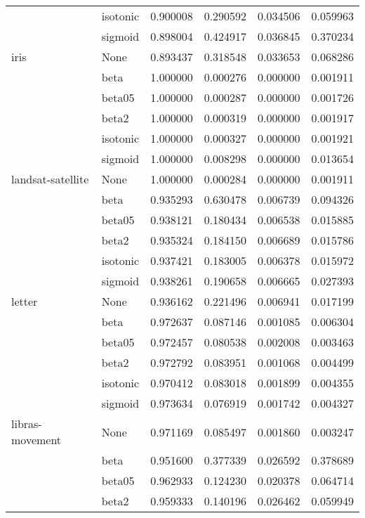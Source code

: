 \begin{tabular}{llrrrr}
        & isotonic &  0.900008 &   0.290592 &  0.034506 &  0.059963 \\
        & sigmoid &  0.898004 &   0.424917 &  0.036845 &  0.370234 \\
iris & None &  0.893437 &   0.318548 &  0.033653 &  0.068286 \\
        & beta &  1.000000 &   0.000276 &  0.000000 &  0.001911 \\
        & beta05 &  1.000000 &   0.000287 &  0.000000 &  0.001726 \\
        & beta2 &  1.000000 &   0.000319 &  0.000000 &  0.001917 \\
        & isotonic &  1.000000 &   0.000327 &  0.000000 &  0.001921 \\
        & sigmoid &  1.000000 &   0.008298 &  0.000000 &  0.013654 \\
landsat-satellite & None &  1.000000 &   0.000284 &  0.000000 &  0.001911 \\
        & beta &  0.935293 &   0.630478 &  0.006739 &  0.094326 \\
        & beta05 &  0.938121 &   0.180434 &  0.006538 &  0.015885 \\
        & beta2 &  0.935324 &   0.184150 &  0.006689 &  0.015786 \\
        & isotonic &  0.937421 &   0.183005 &  0.006378 &  0.015972 \\
        & sigmoid &  0.938261 &   0.190658 &  0.006665 &  0.027393 \\
letter & None &  0.936162 &   0.221496 &  0.006941 &  0.017199 \\
        & beta &  0.972637 &   0.087146 &  0.001085 &  0.006304 \\
        & beta05 &  0.972457 &   0.080538 &  0.002008 &  0.003463 \\
        & beta2 &  0.972792 &   0.083951 &  0.001068 &  0.004499 \\
        & isotonic &  0.970412 &   0.083018 &  0.001899 &  0.004355 \\
        & sigmoid &  0.973634 &   0.076919 &  0.001742 &  0.004327 \\
libras-movement & None &  0.971169 &   0.085497 &  0.001860 &  0.003247 \\
        & beta &  0.951600 &   0.377339 &  0.026592 &  0.378689 \\
        & beta05 &  0.962933 &   0.124230 &  0.020378 &  0.064714 \\
        & beta2 &  0.959333 &   0.140196 &  0.026462 &  0.059949 \\

\end{tabular}
